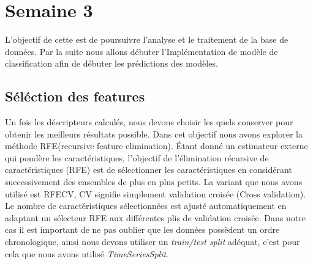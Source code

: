 \chapter{Semaine 3 }

L'objectif de cette est de poursuivre l'analyse et le traitement de la 
base de données. 
Par la suite nous allons débuter l'Implémentation de modèle de classification 
afin de débuter les prédictions des modèles.


\section{Séléction des features}

Un fois les déscripteurs calculés, nous devons choisir les quels conserver pour obtenir 
les meilleurs résultats possible. 
Dans cet objectif nous avons explorer la méthode RFE(recursive feature elimination). 
Étant donné un estimateur externe qui pondère les caractéristiques, l'objectif 
de l'élimination récursive de caractéristiques (RFE) est de sélectionner les 
caractéristiques en considérant successivement des ensembles de plus en plus petits.
La variant que nous avons utilisé est RFECV, CV signifie simplement validation 
croisée (Cross validation). Le nombre de caractéristiques sélectionnées est ajusté 
automatiquement en adaptant un sélecteur RFE aux différentes plis de validation 
croisée. Dans notre cas il est important de ne pas oublier que les données 
possèdent un ordre chronologique, ainsi nous devons utiliser un \textit{train/test split} 
adéquat, c'est pour cela que nous avons utilisé \textit{TimeSeriesSplit}.  